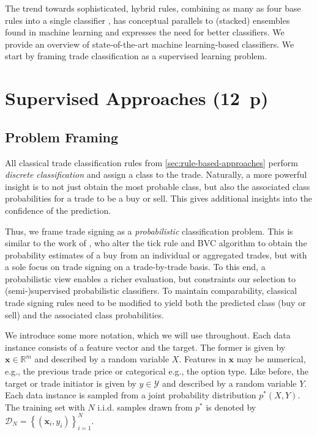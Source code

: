 The trend towards sophisticated, hybrid rules, combining as many as four base rules into a single classifier \autocite[cp.][18]{grauerOptionTradeClassification2022}, has conceptual parallels to (stacked) ensembles found in machine learning and expresses the need for better classifiers. We provide an overview of state-of-the-art machine learning-based classifiers. We start by framing trade classification as a supervised learning problem.

\newpage
{}
\section{Supervised Approaches (12~p)}\label{sec:supervised-approaches}
\subsection{Problem Framing}\label{sec:problem-framing}

All classical trade classification rules from \cref{sec:rule-based-approaches}  perform \emph{discrete classification} and assign a class to the trade. Naturally, a more powerful insight is to not just obtain the most probable class, but also the associated class probabilities for a trade to be a buy or sell. This gives additional insights into the confidence of the prediction.

Thus, we frame trade signing as a \emph{probabilistic} classification problem. This is similar to the work of \textcite[][272]{easleyDiscerningInformationTrade2016}, who alter the tick rule and \gls{BVC} algorithm to obtain the probability estimates of a buy from an individual or aggregated trades, but with a sole focus on trade signing on a trade-by-trade basis. To this end, a probabilistic view enables a richer evaluation, but constraints our selection to (semi-)supervised probabilistic classifiers. To maintain comparability, classical trade signing rules need to be modified to yield both the predicted class (buy or sell) and the associated class probabilities.

We introduce some more notation, which we will use throughout. Each data instance consists of a feature vector and the target. The former is given by $\boldsymbol{x} \in \mathbb{R}^m$ and described by a random variable $X$. Features in $\boldsymbol{x}$ may be numerical, e.g., the previous trade price or categorical e.g., the option type. Like before, the target or trade initiator is given by $y \in \mathcal{Y}$ and described by a random variable $Y$. Each data instance is sampled from a joint probability distribution $p^*(X, Y)$. The training set with $N$ i.i.d. samples drawn from $p^*$ is denoted by $\mathcal{D}_N=\left\{\left(\boldsymbol{x}_i, y_i\right)\right\}_{i=1}^N$.

